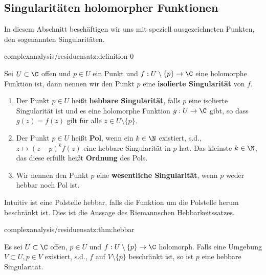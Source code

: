 \documentclass[letterpaper,10pt,german]{jupyterBook}
\begin{document}
\subsection{Singularitäten holomorpher Funktionen}
\label{\detokenize{complexanalysis/residuensatz:singularitaten-holomorpher-funktionen}}
\par
In diesem Abschnitt beschäftigen wir uns mit speziell ausgezeichneten Punkten, den sogenannten Singularitäten.
\begin{definition}{}{complexanalysis/residuensatz:definition-0}



\par
Sei \(U \subset \C\) offen und \(p\in U\) ein Punkt und \(f: U \setminus \{p\}\to\C\) eine holomorphe Funktion ist, dann nennen wir den Punkt \(p\) eine \textbf{isolierte Singularität} von \(f\).
\begin{enumerate}

\item {} 
\par
Der Punkt \(p\in U\) heißt \textbf{hebbare Singularität}, falls \(p\) eine isolierte Singularität ist und es eine holomorphe Funktion \(g:U\to\C\) gibt, so dass \(g(z) = f(z)\) gilt für alle \(z \in U \setminus \{p\}\).

\item {} 
\par
Der Punkt \(p\in U\) heißt \textbf{Pol}, wenn ein \(k\in\N\) existiert, s.d., \(z\mapsto (z-p)^k f(z)\) eine hebbare Singularität in \(p\) hat. Das kleinste \(k\in\N\), das diese erfüllt heißt \textbf{Ordnung} des Pols.

\item {} 
\par
Wir nennen den Punkt \(p\) eine \textbf{wesentliche Singularität}, wenn \(p\) weder hebbar noch Pol ist.

\end{enumerate}
\end{definition}

\par
Intuitiv ist eine Polstelle hebbar, falls die Funktion um die Polstelle herum beschränkt ist. Dies ist die Aussage des Riemannschen Hebbarkeitssatzes.
\begin{theorem}{}{complexanalysis/residuensatz:thm:hebbar}



\par
Es sei \(U\subset \C\) offen, \(p\in U\) und \(f:U\setminus\{p\}\to\C\) holomorph. Falls eine Umgebung \(V\subset U, p\in V\) existiert, s.d., \(f\) auf \(V\setminus\{p\}\) beschränkt ist, so ist \(p\) eine hebbare Singularität.
\end{theorem}
\end{document}
